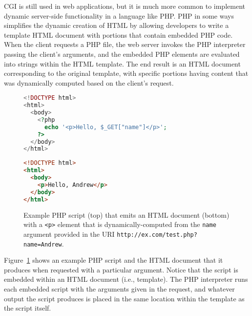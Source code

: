 \documentclass[11pt,twoside]{scrartcl}
\begin{document}
CGI is still used in web applications, but it is much more common to implement dynamic server-side functionality in a language like PHP. PHP in some ways simplifies the dynamic creation of HTML by allowing developers to write a template HTML document with portions that contain embedded PHP code. When the client requests a PHP file, the web server invokes the PHP interpreter passing the client's arguments, and the embedded PHP elements are evaluated into strings within the HTML template. The end result is an HTML document corresponding to the original template, with specific portions having content that was dynamically computed based on the client's request.

\begin{figure}
\begin{lstlisting}[language=PHP]
<!DOCTYPE html>
<html>
  <body>
    <?php 
      echo '<p>Hello, $_GET["name"]</p>'; 
    ?>
  </body>
</html>
\end{lstlisting}

\begin{lstlisting}[language=HTML]
<!DOCTYPE html>
<html>
  <body>
    <p>Hello, Andrew</p>
  </body>
</html>
\end{lstlisting}

\caption{\label{fig:php} Example PHP script (top) that emits an HTML document (bottom) with a \texttt{<p>} element that is dynamically-computed from the \texttt{name} argument provided in the URI \nolinkurl{http://ex.com/test.php?name=Andrew}.}
\end{figure}

Figure~\ref{fig:php} shows an example PHP script and the HTML document that it produces when requested with a particular argument. Notice that the script is embedded within an HTML document (i.e., template). The PHP interpreter runs each embedded script with the arguments given in the request, and whatever output the script produces is placed in the same location within the template as the script itself.



\end{document}
